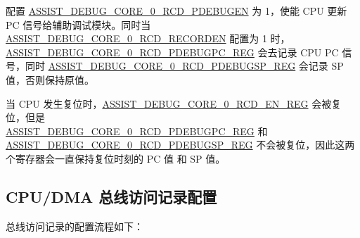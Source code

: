 \documentclass[main\_\_CN.tex]{subfiles}
\begin{document}
配置 \hyperref[fielddesc:ASSISTDEBUGCORE0RCDPDEBUGEN]{ASSIST\_DEBUG\_CORE\_0\_RCD\_PDEBUGEN} 为 1，使能 CPU 更新 PC 信号给辅助调试模块。同时当 \hyperref[fielddesc:ASSISTDEBUGCORE0RCDRECORDEN]{ASSIST\_DEBUG\_CORE\_0\_RCD\_RECORDEN} 配置为 1 时，\\\hyperref[regdesc:ASSISTDEBUGCORE0RCDPDEBUGPCREG]{ASSIST\_DEBUG\_CORE\_0\_RCD\_PDEBUGPC\_REG} 会去记录 CPU PC 信号，同时 \hyperref[regdesc:ASSISTDEBUGCORE0RCDPDEBUGSPREG]{ASSIST\_DEBUG\_CORE\_0\_RCD\_PDEBUGSP\_REG} 会记录 SP 值，否则保持原值。

当 CPU 发生复位时，\hyperref[regdesc:ASSISTDEBUGCORE0RCDENREG]{ASSIST\_DEBUG\_CORE\_0\_RCD\_EN\_REG} 会被复位，但是\\ \hyperref[regdesc:ASSISTDEBUGCORE0RCDPDEBUGPCREG]{ASSIST\_DEBUG\_CORE\_0\_RCD\_PDEBUGPC\_REG} 和 \hyperref[regdesc:ASSISTDEBUGCORE0RCDPDEBUGSPREG]{ASSIST\_DEBUG\_CORE\_0\_RCD\_PDEBUGSP\_REG} 不会被复位，因此这两个寄存器会一直保持复位时刻的 PC 值 和 SP 值。

\subsection{CPU/DMA 总线访问记录配置}
总线访问记录的配置流程如下：
\end{document}
